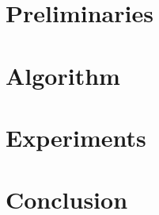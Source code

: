 \documentclass{llncs}
\begin{document}
\section{Preliminaries}
\label{sec:model}




\section{Algorithm}
\label{sec:algo}

 



\section{Experiments}
\label{sec:experiments}


%


\section{Conclusion}
\label{sec:conclusion}





\appendix


\end{document}
